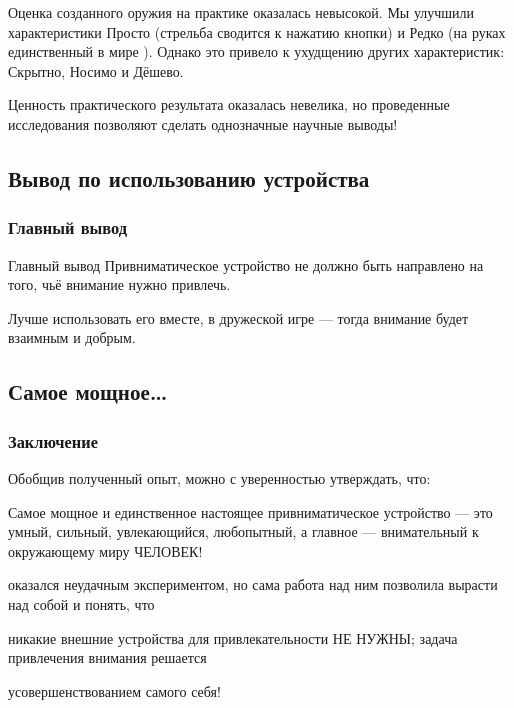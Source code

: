 Оценка созданного оружия на практике оказалась невысокой. Мы улучшили характеристики \alert{Просто} (стрельба сводится к нажатию кнопки) и \alert{Редко} (на руках единственный в мире {\myDevice}). Однако это привело к ухудщению других характеристик: Скрытно, Носимо и Дёшево.

Ценность практического результата оказалась невелика, но проведенные исследования позволяют сделать однозначные научные выводы!


\subsection{Вывод по использованию устройства}

\begin{frame}
    \frametitle{Главный вывод}
    
    \begin{block}{Главный вывод}
        Привниматическое устройство \alert{не должно} быть направлено на того, чьё внимание нужно привлечь. 
    \end{block}
    
    \par\bigskip
    
    Лучше использовать его вместе, в дружеской игре --- тогда внимание будет \alert{взаимным} и \alert{добрым}.
\end{frame}


\subsection{Самое мощное\ldots}

\begin{frame}
    \frametitle{Заключение}
    
    Обобщив полученный опыт, можно с уверенностью утверждать, что:
    
    \begin{block}{}
        Самое мощное и \alert{единственное настоящее} привниматическое устройство --- это умный, сильный, увлекающийся, любопытный, а главное --- \alert{внимательный} к окружающему миру \alert{ЧЕЛОВЕК}!
    \end{block}
    
    {\myDevice} оказался неудачным экспериментом, но сама работа над ним позволила вырасти над собой и понять, что

    \begin{block}{}
        никакие внешние устройства для привлекательности \alert{НЕ НУЖНЫ}; задача привлечения внимания решается 
        \begin{center}
            \alert{усовершенствованием самого себя}!
        \end{center}
    \end{block}
\end{frame}

